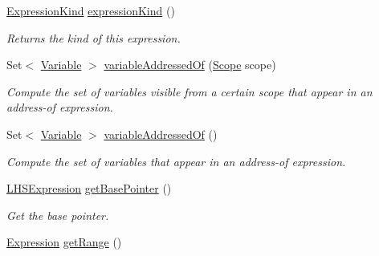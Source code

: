 \begin{DoxyCompactItemize}
\item 
\hyperlink{enumedu_1_1udel_1_1cis_1_1vsl_1_1civl_1_1model_1_1IF_1_1expression_1_1Expression_1_1ExpressionKind}{Expression\+Kind} \hyperlink{classedu_1_1udel_1_1cis_1_1vsl_1_1civl_1_1model_1_1common_1_1expression_1_1CommonPointerSetExpression_a3db84dff3cc03f762442bb0d34eda957}{expression\+Kind} ()
\begin{DoxyCompactList}\small\item\em Returns the kind of this expression. \end{DoxyCompactList}\item 
Set$<$ \hyperlink{interfaceedu_1_1udel_1_1cis_1_1vsl_1_1civl_1_1model_1_1IF_1_1variable_1_1Variable}{Variable} $>$ \hyperlink{classedu_1_1udel_1_1cis_1_1vsl_1_1civl_1_1model_1_1common_1_1expression_1_1CommonPointerSetExpression_a8f9fee91e41b55d14ff7de929f052102}{variable\+Addressed\+Of} (\hyperlink{interfaceedu_1_1udel_1_1cis_1_1vsl_1_1civl_1_1model_1_1IF_1_1Scope}{Scope} scope)
\begin{DoxyCompactList}\small\item\em Compute the set of variables visible from a certain scope that appear in an address-\/of expression. \end{DoxyCompactList}\item 
Set$<$ \hyperlink{interfaceedu_1_1udel_1_1cis_1_1vsl_1_1civl_1_1model_1_1IF_1_1variable_1_1Variable}{Variable} $>$ \hyperlink{classedu_1_1udel_1_1cis_1_1vsl_1_1civl_1_1model_1_1common_1_1expression_1_1CommonPointerSetExpression_ac3d1f8852f77fc21b5029412e9e93ddf}{variable\+Addressed\+Of} ()
\begin{DoxyCompactList}\small\item\em Compute the set of variables that appear in an address-\/of expression. \end{DoxyCompactList}\item 
\hyperlink{interfaceedu_1_1udel_1_1cis_1_1vsl_1_1civl_1_1model_1_1IF_1_1expression_1_1LHSExpression}{L\+H\+S\+Expression} \hyperlink{classedu_1_1udel_1_1cis_1_1vsl_1_1civl_1_1model_1_1common_1_1expression_1_1CommonPointerSetExpression_acc5ad18d855080da83bfe619b055bb27}{get\+Base\+Pointer} ()
\begin{DoxyCompactList}\small\item\em Get the base pointer. \end{DoxyCompactList}\item 
\hyperlink{interfaceedu_1_1udel_1_1cis_1_1vsl_1_1civl_1_1model_1_1IF_1_1expression_1_1Expression}{Expression} \hyperlink{classedu_1_1udel_1_1cis_1_1vsl_1_1civl_1_1model_1_1common_1_1expression_1_1CommonPointerSetExpression_ad0cb578813589dc4b89163c078f2cc77}{get\+Range} ()

\end{DoxyCompactItemize}
